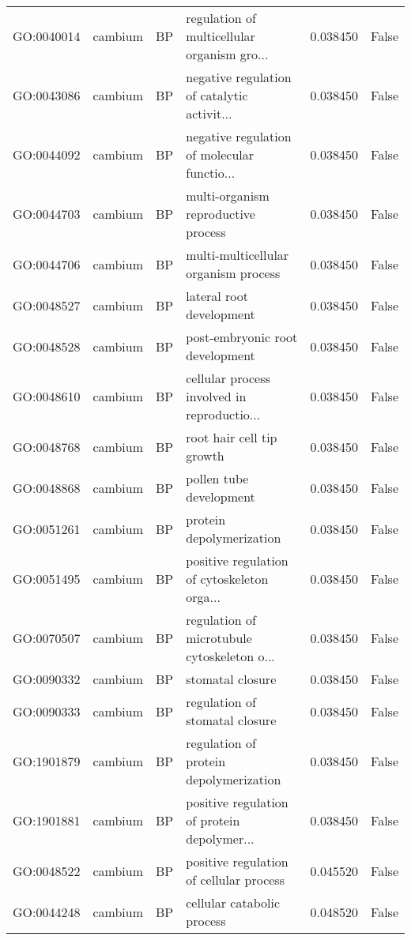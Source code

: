 \begin{longtable}{llllrl}
GO:0040014 & cambium & BP &   regulation of multicellular organism gro...  & 0.038450 &   False \\
GO:0043086 & cambium & BP &   negative regulation of catalytic activit...  & 0.038450 &   False \\
GO:0044092 & cambium & BP &   negative regulation of molecular functio...  & 0.038450 &   False \\
GO:0044703 & cambium & BP &   multi-organism reproductive process  & 0.038450 &   False \\
GO:0044706 & cambium & BP &   multi-multicellular organism process  & 0.038450 &   False \\
GO:0048527 & cambium & BP &   lateral root development  & 0.038450 &   False \\
GO:0048528 & cambium & BP &   post-embryonic root development  & 0.038450 &   False \\
GO:0048610 & cambium & BP &   cellular process involved in reproductio...  & 0.038450 &   False \\
GO:0048768 & cambium & BP &   root hair cell tip growth  & 0.038450 &   False \\
GO:0048868 & cambium & BP &   pollen tube development  & 0.038450 &   False \\
GO:0051261 & cambium & BP &   protein depolymerization  & 0.038450 &   False \\
GO:0051495 & cambium & BP &   positive regulation of cytoskeleton orga...  & 0.038450 &   False \\
GO:0070507 & cambium & BP &   regulation of microtubule cytoskeleton o...  & 0.038450 &   False \\
GO:0090332 & cambium & BP &   stomatal closure  & 0.038450 &   False \\
GO:0090333 & cambium & BP &   regulation of stomatal closure  & 0.038450 &   False \\
GO:1901879 & cambium & BP &   regulation of protein depolymerization  & 0.038450 &   False \\
GO:1901881 & cambium & BP &   positive regulation of protein depolymer...  & 0.038450 &   False \\
GO:0048522 & cambium & BP &   positive regulation of cellular process  & 0.045520 &   False \\
GO:0044248 & cambium & BP &   cellular catabolic process  & 0.048520 &   False \\
\bottomrule
\end{longtable}
